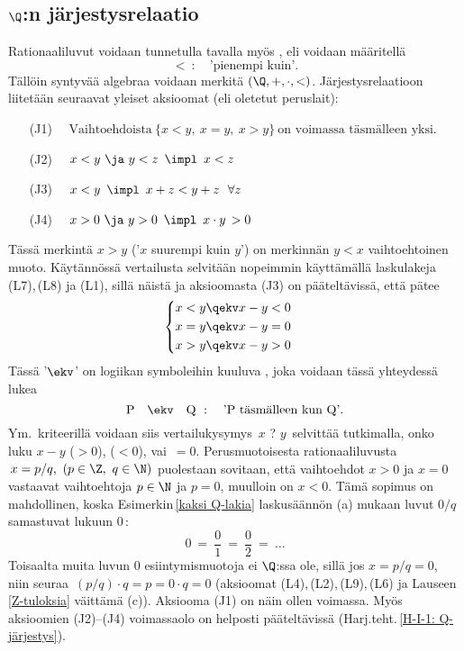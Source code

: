 \subsection*{$\Q$:n järjestysrelaatio}

Rationaaliluvut voidaan tunnetulla tavalla myös , eli voidaan määritellä
\[
<\ : \quad \text{'pienempi kuin'}.
\]
Tällöin syntyvää algebraa voidaan merkitä $(\Q,+,\cdot,<)$. Järjestysrelaatioon liitetään seuraavat
yleiset aksioomat (eli oletetut peruslait):

\pagebreak

\begin{itemize}
\item[(J1)] $\quad \text{Vaihtoehdoista}\ \{x<y,\ x=y,\ x>y\}\ 
                                          \text{on voimassa täsmälleen yksi}.$
\item[(J2)] $\quad x<y\ \ja\ y<z \,\ \impl\,\ x<z$
\item[(J3)] $\quad x<y \,\ \impl\,\ x+z < y+z \ \ \forall z$
\item[(J4)] $\quad x > 0 \ \ja\ y > 0 \,\ \impl\,\ x \cdot y\, > 0$
\end{itemize}
Tässä merkintä $x>y$ ('$x$ suurempi kuin $y$') on merkinnän $y<x$ vaihtoehtoinen muoto. Käytännössä 
vertailusta selvitään nopeimmin käyttämällä laskulakeja (L7),\,(L8) ja (L1), sillä näistä ja 
aksioomasta (J3) on pääteltävissä, että pätee
\[ 
\begin{cases} \begin{aligned}
x<y &\qekv x-y < 0 \\ x=y &\qekv x-y = 0 \\ x>y &\qekv x-y > 0
\end{aligned} \end{cases}
\] 
Tässä '$\ekv$' on logiikan symboleihin kuuluva , joka voidaan tässä 
yhteydessä lukea
\[
\text{P} \quad \ekv \quad \text{Q}\ : \quad \text{'P täsmälleen kun Q'}.
\]
Ym.\ kriteerillä voidaan siis vertailukysymys $\,x$ ? $y\,$ selvittää tutkimalla, onko luku 
$x-y$ \kor{positiivinen} ($>0$), \kor{negatiivinen} ($<0$), vai $\,=0$. Perusmuotoisesta
rationaaliluvusta $\,x = p/q,\ (p\in\Z,\ q\in \N)$ puolestaan sovitaan, että vaihtoehdot
$x>0$ ja $x=0$ vastaavat vaihtoehtoja $p\in\N$ ja $p=0$, muulloin on $x<0$. Tämä sopimus on
mahdollinen, koska Esimerkin\,\ref{kaksi Q-lakia} laskusäännön (a) mukaan luvut $0/q$ samastuvat
lukuun $0$\,:
\[
0\ =\ \dfrac{0}{1}\ =\ \dfrac{0}{2}\ =\ \ldots
\]
Toisaalta muita luvun $0$ esiintymismuotoja ei $\Q$:ssa ole, sillä jos $x=p/q=0$, niin seuraa
$\,(p/q) \cdot q = p = 0 \cdot q = 0$ (aksioomat (L4),\,(L2),\,(L9),\,(L6) ja Lauseen \ref{Z-tuloksia}
väittämä (c)). Aksiooma (J1) on näin ollen voimassa. Myös aksioomien (J2)--(J4) voimassaolo on
helposti pääteltävissä (Harj.teht.\,\ref{H-I-1: Q-järjestys}).

